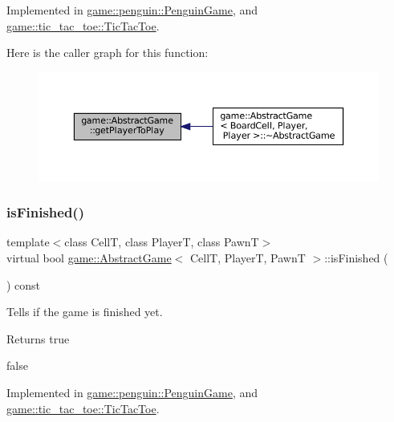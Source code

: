 Implemented in \hyperlink{classgame_1_1penguin_1_1_penguin_game_aac449b76f27098b1d2218cc51e7f70b4}{game\+::penguin\+::\+Penguin\+Game}, and \hyperlink{classgame_1_1tic__tac__toe_1_1_tic_tac_toe_ae460add5608bc785e202c876dea8f9ba}{game\+::tic\+\_\+tac\+\_\+toe\+::\+Tic\+Tac\+Toe}.

Here is the caller graph for this function\+:
\nopagebreak
\begin{figure}[H]
\begin{center}
\leavevmode
\includegraphics[width=350pt]{classgame_1_1_abstract_game_a059d72564d4658be3c246d8865080d92_icgraph}
\end{center}
\end{figure}
\mbox{\label{classgame_1_1_abstract_game_a598679eebf40ccc300e9065bce875fd1}} 
\subsubsection{\texorpdfstring{is\+Finished()}{isFinished()}}
{\footnotesize\ttfamily template$<$class CellT, class PlayerT, class PawnT$>$ \\
virtual bool \hyperlink{classgame_1_1_abstract_game}{game\+::\+Abstract\+Game}$<$ CellT, PlayerT, PawnT $>$\+::is\+Finished (\begin{DoxyParamCaption}{ }\end{DoxyParamCaption}) const\hspace{0.3cm}{\ttfamily [pure virtual]}}



Tells if the game is finished yet. 

\begin{DoxyReturn}{Returns}
true 

false 
\end{DoxyReturn}


Implemented in \hyperlink{classgame_1_1penguin_1_1_penguin_game_ae5e55157da5e8a1ed2ccc2c9cbbad50d}{game\+::penguin\+::\+Penguin\+Game}, and \hyperlink{classgame_1_1tic__tac__toe_1_1_tic_tac_toe_a06463011bee6de3d33946f9162970989}{game\+::tic\+\_\+tac\+\_\+toe\+::\+Tic\+Tac\+Toe}.

